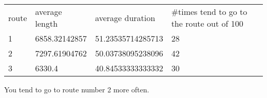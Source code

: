 \documentclass{article}
\begin{document}
\begin{table}[]
\begin{tabular}{llll}
route & average length        & average duration  & \#times tend to go to the route out of 100 \\
1     & 6858.32142857 & 51.23535714285713 & 28                              \\
2     & 7297.61904762 & 50.03738095238096 & 42                              \\
3     & 6330.4        & 40.84533333333332 & 30                             
\end{tabular}
\end{table}
You tend to go to route number 2 more often.
\end{document}

